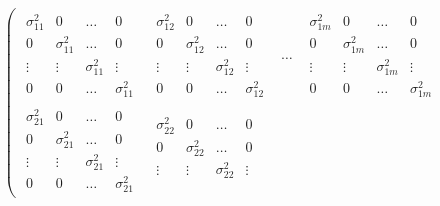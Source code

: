\begin{gather*}
\left(
\begin{matrix}
\begin{matrix}
	\sigma ^2 _{11} & 0               & \dots           & 0               \\
	0               & \sigma ^2 _{11} & \dots           & 0               \\
	\vdots          & \vdots          & \sigma ^2 _{11} & \vdots          \\
	0               & 0               & \dots           & \sigma ^2 _{11}
\end{matrix}
&
\begin{matrix}
	\sigma ^2 _{12} & 0               & \dots           & 0               \\
	0               & \sigma ^2 _{12} & \dots           & 0               \\
	\vdots          & \vdots          & \sigma ^2 _{12} & \vdots          \\
	0               & 0               & \dots           & \sigma ^2 _{12}
\end{matrix}
& \dots &
\begin{matrix}
	\sigma ^2 _{1m} & 0               & \dots           & 0               \\
	0               & \sigma ^2 _{1m} & \dots           & 0               \\
	\vdots          & \vdots          & \sigma ^2 _{1m} & \vdots          \\
	0               & 0               & \dots           & \sigma ^2 _{1m}
\end{matrix}
\\
\begin{matrix}
	\sigma ^2 _{21} & 0               & \dots           & 0               \\
	0               & \sigma ^2 _{21} & \dots           & 0               \\
	\vdots          & \vdots          & \sigma ^2 _{21} & \vdots          \\
	0               & 0               & \dots           & \sigma ^2 _{21}
\end{matrix}
&
\begin{matrix}
	\sigma ^2 _{22} & 0               & \dots           & 0               \\
	0               & \sigma ^2 _{22} & \dots           & 0               \\
	\vdots          & \vdots          & \sigma ^2 _{22} & \vdots          \\

\end{matrix}
\end{matrix}
\end{gather*}
